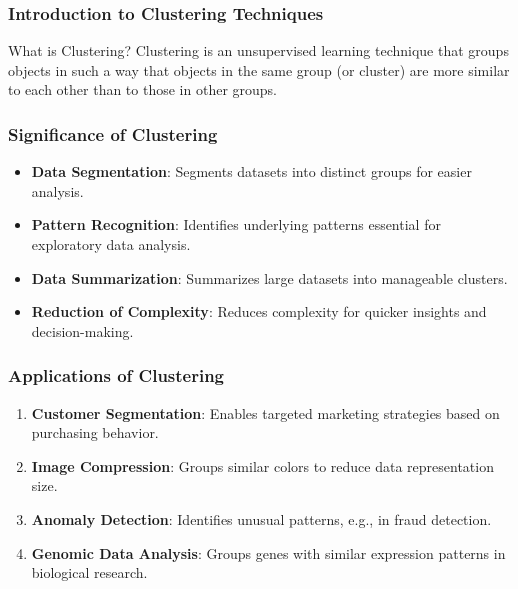 \documentclass[aspectratio=169]{beamer}
\begin{document}
\frame{\titlepage}

\begin{frame}[fragile]
    \frametitle{Introduction to Clustering Techniques}
    \begin{block}{What is Clustering?}
        Clustering is an unsupervised learning technique that groups objects in such a way that objects in the same group (or cluster) are more similar to each other than to those in other groups.
    \end{block}
\end{frame}

\begin{frame}[fragile]
    \frametitle{Significance of Clustering}
    \begin{itemize}
        \item \textbf{Data Segmentation}: Segments datasets into distinct groups for easier analysis.
        \item \textbf{Pattern Recognition}: Identifies underlying patterns essential for exploratory data analysis.
        \item \textbf{Data Summarization}: Summarizes large datasets into manageable clusters.
        \item \textbf{Reduction of Complexity}: Reduces complexity for quicker insights and decision-making.
    \end{itemize}
\end{frame}

\begin{frame}[fragile]
    \frametitle{Applications of Clustering}
    \begin{enumerate}
        \item \textbf{Customer Segmentation}: Enables targeted marketing strategies based on purchasing behavior.
        \item \textbf{Image Compression}: Groups similar colors to reduce data representation size.
        \item \textbf{Anomaly Detection}: Identifies unusual patterns, e.g., in fraud detection.
        \item \textbf{Genomic Data Analysis}: Groups genes with similar expression patterns in biological research.
    \end{enumerate}
\end{frame}
\end{document}
